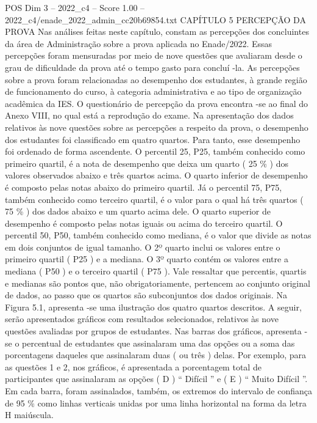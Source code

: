 \begin{textsample}{POS Dim 3 – 2022\_c4 – Score 1.00 – 2022\_c4/enade\_2022\_admin\_cc20b69854.txt}  \label{ex:f3_pos_178}
CAPÍTULO 5 PERCEPÇÃO DA PROVA Nas análises feitas neste capítulo, constam as percepções dos concluintes da área de Administração sobre a prova aplicada no Enade/2022.
Essas percepções foram mensuradas por meio de nove questões que avaliaram desde o grau de dificuldade da prova até o tempo gasto para concluí -la.
As percepções sobre a prova foram relacionadas ao desempenho dos estudantes, à grande região de funcionamento do curso, à categoria administrativa e ao tipo de organização acadêmica da IES.
O questionário de percepção da prova encontra -se ao final do Anexo VIII, no qual está a reprodução do exame.
Na apresentação dos dados relativos às nove questões sobre as percepções a respeito da prova, o desempenho dos estudantes foi classificado em quatro quartos.
Para tanto, esse desempenho foi ordenado de forma ascendente.
O percentil 25, P25, também conhecido como primeiro quartil, é a nota de desempenho que deixa um quarto ( 25 \% ) dos valores observados abaixo e três quartos acima.
O quarto inferior de desempenho é composto pelas notas abaixo do primeiro quartil.
Já o percentil 75, P75, também conhecido como terceiro quartil, é o valor para o qual há três quartos ( 75 \% ) dos dados abaixo e um quarto acima dele.
O quarto superior de desempenho é composto pelas notas iguais ou acima do terceiro quartil.
O percentil 50, P50, também conhecido como mediana, é o valor que divide as notas em dois conjuntos de igual tamanho.
O 2º quarto inclui os valores entre o primeiro quartil ( P25 ) e a mediana.
O 3º quarto contém os valores entre a mediana ( P50 ) e o terceiro quartil ( P75 ).
Vale ressaltar que percentis, quartis e medianas são pontos que, não obrigatoriamente, pertencem ao conjunto original de dados, ao passo que os quartos são subconjuntos dos dados originais.
Na Figura 5.1, apresenta -se uma ilustração dos quatro quartos descritos.
A seguir, serão apresentados gráficos com resultados selecionados, relativos às nove questões avaliadas por grupos de estudantes.
Nas barras dos gráficos, apresenta -se o percentual de estudantes que assinalaram uma das opções ou a soma das porcentagens daqueles que assinalaram duas ( ou três ) delas.
Por exemplo, para as questões 1 e 2, nos gráficos, é apresentada a porcentagem total de participantes que assinalaram as opções ( D ) “ Difícil ” e ( E ) “ Muito Difícil ”.
Em cada barra, foram assinalados, também, os extremos do intervalo de confiança de 95 \% como linhas verticais unidas por uma linha horizontal na forma da letra H maiúscula.

\end{textsample}
